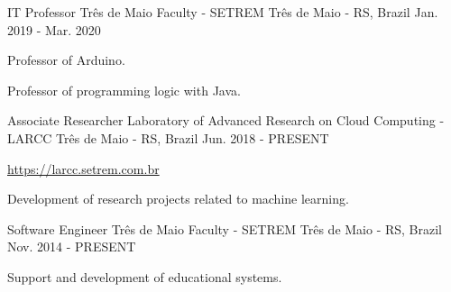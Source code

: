 
\begin{cventries}
	\cventry
	{IT Professor} %
	{Três de Maio Faculty - SETREM} %
	{Três de Maio - RS, Brazil} %
	{Jan. 2019 - Mar. 2020} %
	{
		\begin{cvitems} %
			\item {Professor of Arduino.}
			\item {Professor of programming logic with Java.}
		\end{cvitems}
	}

	\cventry
	{Associate Researcher} %
	{Laboratory of Advanced Research on Cloud Computing - LARCC} %
	{Três de Maio - RS, Brazil} %
	{Jun. 2018 - PRESENT} %
	{
		\begin{cvitems} %
			\item {\href{https://larcc.setrem.com.br}{https://larcc.setrem.com.br}}
			\item {Development of research projects related to machine learning.}
		\end{cvitems}
	}

	\cventry
	{Software Engineer} %
	{Três de Maio Faculty - SETREM} %
	{Três de Maio - RS, Brazil} %
	{Nov. 2014 - PRESENT} %
	{
		\begin{cvitems} %
			\item {Support and development of educational systems.}
		\end{cvitems}
	}

\end{cventries}
